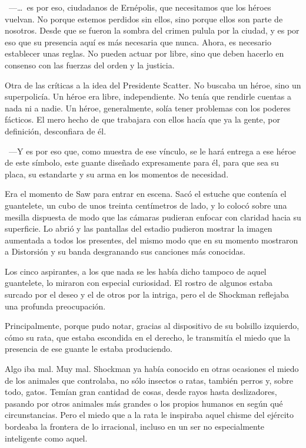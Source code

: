 ~---\dots\ es por eso, ciudadanos de Ernépolis, que necesitamos que los héroes vuelvan. No porque estemos perdidos sin ellos, sino porque ellos son parte de nosotros. Desde que se fueron la sombra del crimen pulula por la ciudad, y es por eso que su presencia aquí es más necesaria que nunca. Ahora, es necesario establecer unas reglas. No pueden actuar por libre, sino que deben hacerlo en consenso con las fuerzas del orden y la justicia.

Otra de las críticas a la idea del Presidente Scatter. No buscaba un héroe, sino un superpolicía. Un héroe era libre, independiente. No tenía que rendirle cuentas a nada ni a nadie. Un héroe, generalmente, solía tener problemas con los poderes fácticos. El mero hecho de que trabajara con ellos hacía que ya la gente, por definición, desconfiara de él.

~---Y es por eso que, como muestra de ese vínculo, se le hará entrega a ese héroe de este símbolo, este guante diseñado expresamente para él, para que sea su placa, su estandarte y su arma en los momentos de necesidad.

Era el momento de Saw para entrar en escena. Sacó el estuche que contenía el guantelete, un cubo de unos treinta centímetros de lado, y lo colocó sobre una mesilla dispuesta de modo que las cámaras pudieran enfocar con claridad hacia su superficie. Lo abrió y las pantallas del estadio pudieron mostrar la imagen aumentada a todos los presentes, del mismo modo que en su momento mostraron a Distorsión y su banda desgranando sus canciones más conocidas.

Los cinco aspirantes, a los que nada se les había dicho tampoco de aquel guantelete, lo miraron con especial curiosidad. El rostro de algunos estaba surcado por el deseo y el de otros por la intriga, pero el de Shockman reflejaba una profunda preocupación.

Principalmente, porque pudo notar, gracias al dispositivo de su bolsillo izquierdo, cómo su rata, que estaba escondida en el derecho, le transmitía el miedo que la presencia de ese guante le estaba produciendo.

Algo iba mal. Muy mal. Shockman ya había conocido en otras ocasiones el miedo de los animales que controlaba, no sólo insectos o ratas, también perros y, sobre todo, gatos. Temían gran cantidad de cosas, desde rayos hasta deslizadores, pasando por otros animales más grandes o los propios humanos en según qué circunstancias. Pero el miedo que a la rata le inspiraba aquel chisme del ejército bordeaba la frontera de lo irracional, incluso en un ser no especialmente inteligente como aquel.

